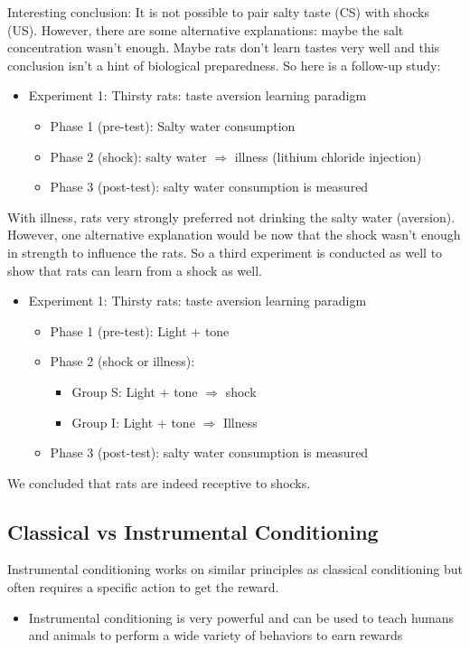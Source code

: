 Interesting conclusion: It is not possible to pair salty taste (CS) with shocks (US). However, there are some alternative explanations: maybe the salt concentration wasn't enough. Maybe rats don't learn tastes very well and this conclusion isn't a hint of biological preparedness. So here is a follow-up study:
\begin{itemize}
    \item Experiment 1: Thirsty rats: taste aversion learning paradigm
    \begin{itemize}
        \item Phase 1 (pre-test): Salty water consumption
        \item Phase 2 (shock): salty water $\Rightarrow$ illness (lithium chloride injection)
        \item Phase 3 (post-test): salty water consumption is measured
    \end{itemize}
\end{itemize}
With illness, rats very strongly preferred not drinking the salty water (aversion). However, one alternative explanation would be now that the shock wasn't enough in strength to influence the rats. So a third experiment is conducted as well to show that rats can learn from a shock as well.
\begin{itemize}
    \item Experiment 1: Thirsty rats: taste aversion learning paradigm
    \begin{itemize}
        \item Phase 1 (pre-test):  Light + tone 
        \item Phase 2 (shock or illness): 
        \begin{itemize}
            \item Group S: Light + tone $\Rightarrow$ shock
            \item Group I: Light + tone $\Rightarrow$ Illness
        \end{itemize}
        \item Phase 3 (post-test): salty water consumption is measured
    \end{itemize}
\end{itemize}
We concluded that rats are indeed receptive to shocks.

\subsection{Classical vs Instrumental Conditioning}
Instrumental conditioning works on similar principles as classical conditioning but often requires a specific action to get the reward.
\begin{itemize}
    \item Instrumental conditioning is very powerful and can be used to teach humans and animals to perform a wide variety of behaviors to earn rewards

\end{itemize}
